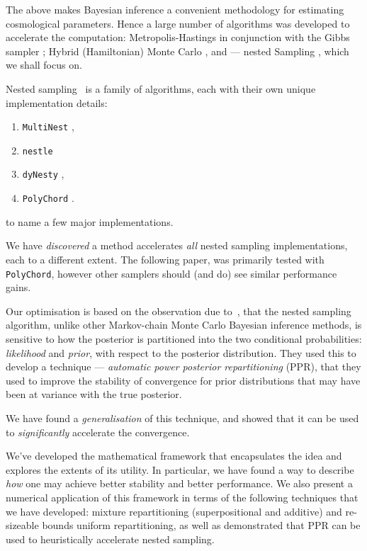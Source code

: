 \documentclass[usenatbib]{mnras}
\begin{document}
The above makes Bayesian inference a convenient methodology for
estimating cosmological parameters. Hence a large number of algorithms
was developed to accelerate the computation: Metropolis-Hastings
\citep{Metropolis} in conjunction with the Gibbs sampler
\citep{Metropolis-Hastings-Gibbs}; Hybrid (Hamiltonian) Monte Carlo
\citep{1701.02434,Duane_1987}, and --- nested Sampling
\citep{Skilling2006}, which we shall focus on.

Nested sampling~\cite{Skilling2006} is a family of algorithms, each
with their own unique implementation details:
\begin{enumerate}
\item \texttt{MultiNest} \citep{Feroz2009MultiNestAE},
\item \texttt{nestle} \citep{nestle}
\item \texttt{dyNesty} \citep{Speagle_2020},
\item \texttt{PolyChord} \citep{polychord}.
\end{enumerate}
to name a few major implementations.

We have \emph{discovered} a method accelerates \emph{all}  nested sampling
implementations, each to a different extent. The following paper, was
primarily tested with \texttt{PolyChord}, however other samplers
should (and do) see similar performance gains.

Our optimisation is based on the observation due
to~\cite{chen-ferroz-hobson}, that the nested sampling algorithm,
unlike other Markov-chain Monte Carlo Bayesian inference methods, is
sensitive to how the posterior is partitioned into the two conditional
probabilities: \emph{likelihood} and \emph{prior}, with respect to the
posterior distribution. They used this to develop a technique ---
\emph{automatic power posterior repartitioning} (PPR), that they used
to improve the stability of convergence for prior distributions that
may have been at variance with the true posterior.

We have found a \emph{generalisation} of this technique, and showed
that it can be used to \emph{significantly} accelerate the convergence.

We've developed the mathematical framework that encapsulates the idea
and explores the extents of its utility. In particular, we have found
a way to describe \emph{how} one may achieve better stability and
better performance. We also present a numerical application of this
framework in terms of the following techniques that we have developed:
mixture repartitioning (superpositional and additive) and re-sizeable
bounds uniform repartitioning, as well as demonstrated that PPR can
be used to heuristically accelerate nested sampling.
\end{document}
